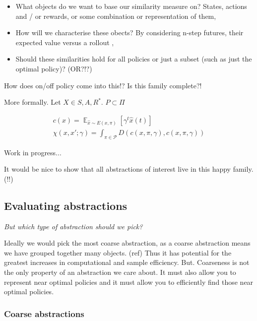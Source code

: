 \begin{itemize}
  \tightlist
  \item What objects do we want to base our similarity measure on? States, actions and / or rewards, or some combination or representation of them,
  \item How will we characterise these obects? By considering n-step futures, their expected value versus a rollout \footnotemark[9],
  \item Should these similarities hold for all policies or just a subset (such as just the optimal policy)? (OR?!?)
\end{itemize}


{\color{red}How does on/off policy come into this!? Is this family complete?!}

More formally. Let $X \in {S, A, R}^{* }$. $P \subset \Pi$

\begin{align*}
c(x) = \mathop{\mathbb E}_{\hat x \sim E(x, \pi)} [\gamma^t \hat x(t)] \\
\chi(x, x'; \gamma) = \int_{\pi \in \mathcal P} D(c(x, \pi, \gamma), c(x, \pi, \gamma))
\end{align*}

{\color{red}Work in progress...}

It would be nice to show that all abstractions of interest live in this happy family. (!!)


\subsection{Evaluating abstractions}

\begin{displayquote}
\textit{But which type of abstraction should we pick?}
\end{displayquote}

Ideally we would pick the most coarse abstraction, as a coarse abstraction means we have grouped together many objects. (ref)
Thus it has potential for the greatest increases in computational and sample efficiency.
But. Coarseness is not the only property of an abstraction we care about.
It must also allow you to represent near optimal policies and it must allow you
to efficiently find those near optimal policies.


\subsubsection{Coarse abstractions}

